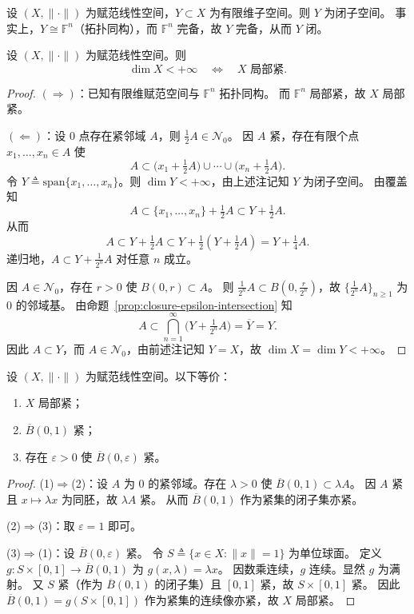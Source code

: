 \documentclass[lang=cn,a4paper,newtx,section]{elegantbook}
\begin{document}
\begin{remark}
  设 $(X,\|\cdot\|)$ 为赋范线性空间，$Y\subset X$ 为有限维子空间。则 $Y$ 为闭子空间。
  事实上，$Y\cong\mathbb{F}^n$（拓扑同构），而 $\mathbb{F}^n$ 完备，故 $Y$ 完备，从而 $Y$ 闭。
\end{remark}

\begin{theorem}
  设 $(X,\|\cdot\|)$ 为赋范线性空间。则
  \[
    \dim X<+\infty\quad\Longleftrightarrow\quad X\text{ 局部紧}.
  \]
\end{theorem}

\begin{proof}
  $(\Rightarrow)$：已知有限维赋范空间与 $\mathbb{F}^n$ 拓扑同构。
  而 $\mathbb{F}^n$ 局部紧，故 $X$ 局部紧。

  $(\Leftarrow)$：设 $0$ 点存在紧邻域 $A$，则 $\frac{1}{2}A\in\mathcal{N}_0$。
  因 $A$ 紧，存在有限个点 $x_1,\ldots,x_n\in A$ 使
  \[
    A\subset\bigl(x_1+\tfrac{1}{2}A\bigr)\cup\cdots\cup\bigl(x_n+\tfrac{1}{2}A\bigr).
  \]
  令 $Y\triangleq\mathrm{span}\{x_1,\ldots,x_n\}$。则 $\dim Y<+\infty$，由上述注记知 $Y$ 为闭子空间。
  由覆盖知
  \[
    A\subset\{x_1,\ldots,x_n\}+\tfrac{1}{2}A\subset Y+\tfrac{1}{2}A.
  \]
  从而
  \[
    A\subset Y+\tfrac{1}{2}A\subset Y+\tfrac{1}{2}(Y+\tfrac{1}{2}A)=Y+\tfrac{1}{4}A.
  \]
  递归地，$A\subset Y+\frac{1}{2^n}A$ 对任意 $n$ 成立。

  因 $A\in\mathcal{N}_0$，存在 $r>0$ 使 $B(0,r)\subset A$。
  则 $\frac{1}{2^n}A\subset B(0,\frac{r}{2^n})$，故 $\{\frac{1}{2^n}A\}_{n\ge 1}$ 为 $0$ 的邻域基。
  由命题~\ref{prop:closure-epsilon-intersection} 知
  \[
    A\subset\bigcap_{n=1}^{\infty}\bigl(Y+\tfrac{1}{2^n}A\bigr)=\overline{Y}=Y.
  \]
  因此 $A\subset Y$，而 $A\in\mathcal{N}_0$，由前述注记知 $Y=X$，故 $\dim X=\dim Y<+\infty$。
\end{proof}

\begin{proposition}
  设 $(X,\|\cdot\|)$ 为赋范线性空间。以下等价：
  \begin{enumerate}
    \item $X$ 局部紧；
    \item $\overline{B}(0,1)$ 紧；
    \item 存在 $\varepsilon>0$ 使 $\overline{B}(0,\varepsilon)$ 紧。
  \end{enumerate}
\end{proposition}

\begin{proof}
  (1)$\Rightarrow$(2)：设 $A$ 为 $0$ 的紧邻域。存在 $\lambda>0$ 使 $\overline{B}(0,1)\subset\lambda A$。
  因 $A$ 紧且 $x\mapsto\lambda x$ 为同胚，故 $\lambda A$ 紧。
  从而 $\overline{B}(0,1)$ 作为紧集的闭子集亦紧。

  (2)$\Rightarrow$(3)：取 $\varepsilon=1$ 即可。

  (3)$\Rightarrow$(1)：设 $\overline{B}(0,\varepsilon)$ 紧。
  令 $S\triangleq\{x\in X:\|x\|=1\}$ 为单位球面。
  定义 $g:S\times[0,1]\to\overline{B}(0,1)$ 为 $g(x,\lambda)=\lambda x$。
  因数乘连续，$g$ 连续。显然 $g$ 为满射。
  又 $S$ 紧（作为 $\overline{B}(0,1)$ 的闭子集）且 $[0,1]$ 紧，故 $S\times[0,1]$ 紧。
  因此 $\overline{B}(0,1)=g(S\times[0,1])$ 作为紧集的连续像亦紧，故 $X$ 局部紧。
\end{proof}
\end{document}
